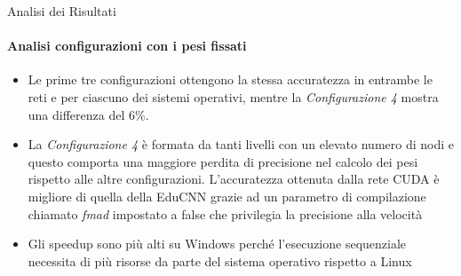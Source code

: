 \documentclass[
 ]{beamer}
\begin{document}
\begin{frame}{Analisi dei Risultati}
    \framesubtitle{Analisi configurazioni con i pesi fissati}
    \smallskip
    \begin{itemize} [<+->]
        \setlength\itemsep{1em}
        \item \large Le prime tre configurazioni ottengono la stessa accuratezza in entrambe le reti e per ciascuno dei sistemi operativi, mentre la \emph{Configurazione 4} mostra una differenza del 6\%. 
        \item \large La \emph{Configurazione 4} è formata da tanti livelli con un elevato numero di nodi e questo comporta una maggiore perdita di precisione nel calcolo dei pesi rispetto alle altre configurazioni. L'accuratezza ottenuta dalla rete CUDA è migliore di quella della EduCNN grazie ad un parametro di compilazione chiamato \emph{fmad} impostato a false che privilegia la precisione alla velocità
        \item \large Gli speedup sono più alti su Windows perché l'esecuzione sequenziale necessita di più risorse da parte del sistema operativo rispetto a Linux
    \end{itemize}     
\end{frame}





\end{document}
